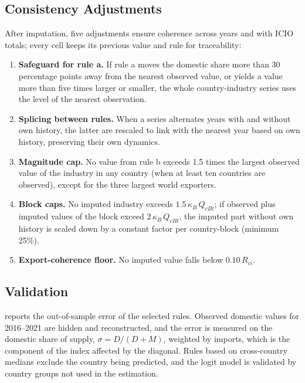 \documentclass[final,1p,times,authoryear]{elsarticle}
\begin{document}
\subsection{Consistency Adjustments}
After imputation, five adjustments ensure coherence across years and with ICIO totals; every cell keeps its previous value and rule for traceability:
\begin{enumerate}[leftmargin=*,itemsep=2pt]
    \item \textbf{Safeguard for rule a.} If rule a moves the domestic share more than 30 percentage points away from the nearest observed value, or yields a value more than five times larger or smaller, the whole country-industry series uses the level of the nearest observation.
    \item \textbf{Splicing between rules.} When a series alternates years with and without own history, the latter are rescaled to link with the nearest year based on own history, preserving their own dynamics.
    \item \textbf{Magnitude cap.} No value from rule b exceeds 1.5 times the largest observed value of the industry in any country (when at least ten countries are observed), except for the three largest world exporters.
    \item \textbf{Block caps.} No imputed industry exceeds $1.5\,\kappa_B\, Q_{cBt}$; if observed plus imputed values of the block exceed $2\,\kappa_B\, Q_{cBt}$, the imputed part without own history is scaled down by a constant factor per country-block (minimum 25\%).
    \item \textbf{Export-coherence floor.} No imputed value falls below $0.10\,R_{ci}$.
\end{enumerate}

\subsection{Validation}
 reports the out-of-sample error of the selected rules. Observed domestic values for 2016--2021 are hidden and reconstructed, and the error is measured on the domestic share of supply, $\sigma = D/(D+M)$, weighted by imports, which is the component of the index affected by the diagonal. Rules based on cross-country medians exclude the country being predicted, and the logit model is validated by country groups not used in the estimation.
\end{document}
